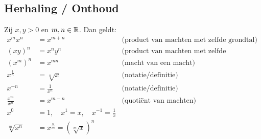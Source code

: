 \documentclass{ximera}
\begin{document}
\subsection{Herhaling / Onthoud }\label{machtenrekenregels}

\begin{proposition}
Zij $x,y>0$ en $m,n\in\mathbb R$. Dan geldt:
\begin{align*}
	x^{m}x^{n}          &= x^{m+n}     & \text{(product van machten met zelfde grondtal)}\\
	(xy)^n              &= x^ny^n      & \text{(product van machten met zelfde exponent)}\\
	\left(x^{m}\right)^{n}&= x^{mn}    & \text{(macht van een macht)}\\	
	x^{\frac1n} &= \sqrt[n] x          & \text{(notatie/definitie)}\\
	x^{-n}          &= \frac{1}{x^n}  & \text{(notatie/definitie)}\\
	\frac{x^{m}}{x^{n}} &= x^{m-n}      & \text{(quotiënt van machten)} \\
	x^0&=1, \quad x^1=x, \quad x^{-1}=\frac1x \\
	\sqrt[m]{x^n} & = x^{\frac{n}{m}} = (\sqrt[m]{x})^n
\end{align*}
\end{proposition}
\end{document}
